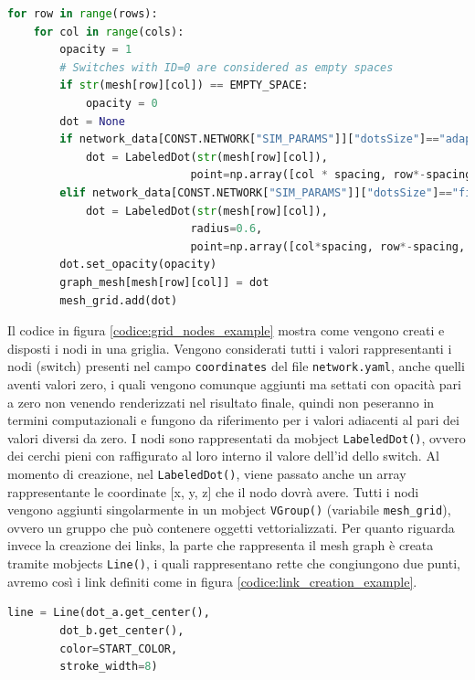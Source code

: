 \documentclass[binding=0.6cm]{sapthesis}
\begin{document}
{\scriptsize %
\begin{lstlisting}[language=Python, caption={Creazione posizionamento nodi nella griglia}, label={codice:grid_nodes_example}]
for row in range(rows):
    for col in range(cols):
        opacity = 1
        # Switches with ID=0 are considered as empty spaces
        if str(mesh[row][col]) == EMPTY_SPACE:
            opacity = 0
        dot = None
        if network_data[CONST.NETWORK["SIM_PARAMS"]]["dotsSize"]=="adaptive":
            dot = LabeledDot(str(mesh[row][col]), 
                            point=np.array([col * spacing, row*-spacing, 0]))
        elif network_data[CONST.NETWORK["SIM_PARAMS"]]["dotsSize"]=="fixed":
            dot = LabeledDot(str(mesh[row][col]), 
                            radius=0.6, 
                            point=np.array([col*spacing, row*-spacing, 0]))
        dot.set_opacity(opacity)
        graph_mesh[mesh[row][col]] = dot
        mesh_grid.add(dot)
\end{lstlisting}
}

Il codice in figura \ref{codice:grid_nodes_example} mostra come vengono creati e disposti i nodi in una griglia. 
Vengono considerati tutti i valori rappresentanti i nodi (switch)
presenti nel campo \texttt{coordinates} del file \texttt{network.yaml}, anche quelli aventi valori zero,
 i quali vengono comunque aggiunti ma settati con opacità pari a zero non venendo renderizzati nel risultato finale,
quindi non peseranno in termini computazionali e fungono da riferimento per i valori adiacenti al pari dei valori diversi da zero.
I nodi sono rappresentati da mobject \lstinline|LabeledDot()|, ovvero dei cerchi pieni con raffigurato al loro interno il valore dell'id dello switch. Al momento di creazione, nel \lstinline|LabeledDot()|,
viene passato anche un array rappresentante le coordinate [x, y, z] che il nodo dovrà avere. 
Tutti i nodi vengono aggiunti singolarmente in un mobject \lstinline|VGroup()| (variabile \texttt{mesh\_grid}),
ovvero un gruppo che può contenere oggetti vettorializzati.
Per quanto riguarda invece la creazione dei links, la parte che rappresenta il mesh graph è creata tramite mobjects \lstinline|Line()|, i quali
rappresentano rette che congiungono due punti, avremo così i link definiti come in figura \ref{codice:link_creation_example}.

{\scriptsize %
\begin{lstlisting}[language=Python, caption={Creazione link}, label={codice:link_creation_example}]
    line = Line(dot_a.get_center(), 
        dot_b.get_center(), 
        color=START_COLOR, 
        stroke_width=8)
\end{lstlisting}
}
\end{document}
